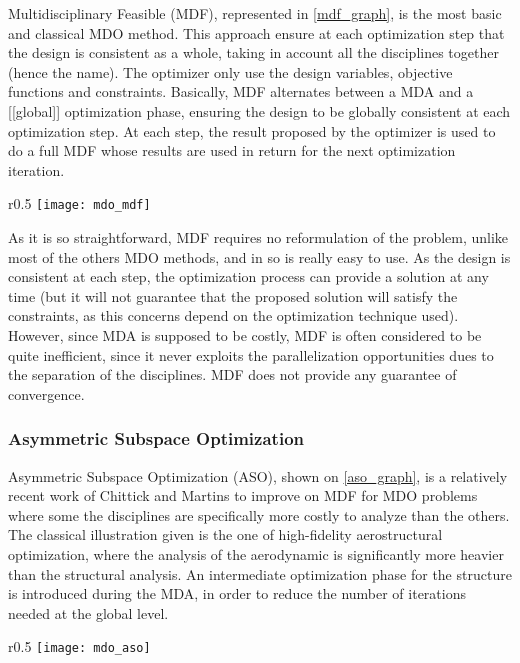 Multidisciplinary Feasible (MDF), represented in \figurename{} \ref{mdf_graph}, is the most basic and classical MDO method. This approach ensure at each optimization step that the design is consistent as a whole, taking in account all the disciplines together (hence the name). The optimizer only use the design variables, objective functions and constraints.
Basically, MDF alternates between a MDA and a [[global]] optimization phase, ensuring the design to be globally consistent at each optimization step. At each step, the result proposed by the optimizer is used to do a full MDF whose results are used in return for the next optimization iteration.

\begin{wrapfigure}{r}{0.5\textwidth}
\centering
\texttt{[image: mdo\_mdf]}
\caption{MDF method}\label{mdf_graph}
\end{wrapfigure}

As it is so straightforward, MDF requires no reformulation of the problem, unlike most of the others MDO methods, and in so is really easy to use. As the design is consistent at each step, the optimization process can provide a solution at any time (but it will not guarantee that the proposed solution will satisfy the constraints, as this concerns depend on the optimization technique used). However, since MDA is supposed to be costly, MDF is often considered to be quite inefficient, since it never exploits the parallelization opportunities dues to the separation of the disciplines. MDF does not provide any guarantee of convergence.

\subsubsection{Asymmetric Subspace Optimization}

Asymmetric Subspace Optimization (ASO), shown on \figurename{} \ref{aso_graph}, is a relatively recent work of Chittick and Martins\cite{Chittick:2007:B} to improve on MDF for MDO problems where some the disciplines are specifically more costly to analyze than the others. The classical illustration given is the one of high-fidelity aerostructural optimization, where the analysis of the aerodynamic is significantly more heavier than the structural analysis. An intermediate optimization phase for the structure is introduced during the MDA, in order to reduce the number of iterations needed at the global level.

\begin{wrapfigure}{r}{0.5\textwidth}
\centering
\texttt{[image: mdo\_aso]}
\caption{ASO method}\label{aso_graph}
\end{wrapfigure}

